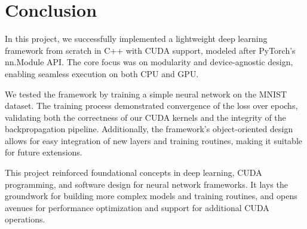 \section{Conclusion}

In this project, we successfully implemented a lightweight deep learning framework from scratch in C++ with CUDA support, modeled after PyTorch’s nn.Module API. The core focus was on modularity and device-agnostic design, enabling seamless execution on both CPU and GPU.

We tested the framework by training a simple neural network on the MNIST dataset. The training process demonstrated convergence of the loss over epochs, validating both the correctness of our CUDA kernels and the integrity of the backpropagation pipeline. Additionally, the framework's object-oriented design allows for easy integration of new layers and training routines, making it suitable for future extensions.

This project reinforced foundational concepts in deep learning, CUDA programming, and software design for neural network frameworks. It lays the groundwork for building more complex models and training routines, and opens avenues for performance optimization and support for additional CUDA operations.